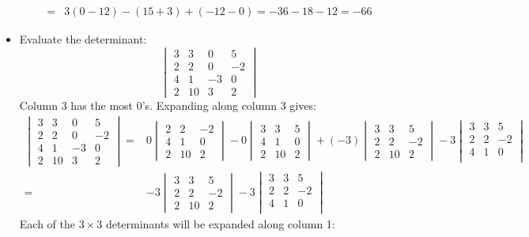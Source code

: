 \documentclass{article}
\begin{document}
\begin{itemize}
\begin{align*}
= & 3(0 - 12) - (15 + 3) + (-12 - 0) 
= -36 - 18 - 12 
= -66 
\end{align*}
\item Evaluate the determinant: 
\[\begin{vmatrix}
3 &  3 &  0 &  5 \\ 
2 &  2 &  0 & -2 \\ 
4 &  1 & -3 &  0 \\ 
2 & 10 & 3 &  2
\end{vmatrix}\]
Column 3 has the most \(0\)'s. Expanding along column 3 gives:
\begin{align*}
\begin{vmatrix}
3 &  3 &  0 &  5 \\ 
2 &  2 &  0 & -2 \\ 
4 &  1 & -3 &  0 \\ 
2 & 10 & 3 &  2
\end{vmatrix} = & 0\begin{vmatrix}
2 &   2 & -2 \\ 
4 &   1 &  0 \\ 
2 & 10 &  2
\end{vmatrix} - 0\begin{vmatrix}
3 &   3 & 5 \\ 
4 &   1 & 0 \\ 
2 & 10 & 2
\end{vmatrix} + (-3)\begin{vmatrix}
3 &   3 &  5 \\ 
2 &   2 & -2 \\ 
2 & 10 &  2
\end{vmatrix} - 3\begin{vmatrix}
3 & 3 &  5 \\ 
2 & 2 & -2 \\ 
4 & 1 &  0 \\ 
\end{vmatrix} \\ 
= & -3\begin{vmatrix}
3 &   3 &  5 \\ 
2 &   2 & -2 \\ 
2 & 10 &  2
\end{vmatrix} - 3\begin{vmatrix}
3 & 3 &  5 \\ 
2 & 2 & -2 \\ 
4 & 1 &  0 \\ 
\end{vmatrix}
\end{align*}
Each of the \(3 \times 3\) determinants will be expanded along column 1:

\end{itemize}
\end{document}
